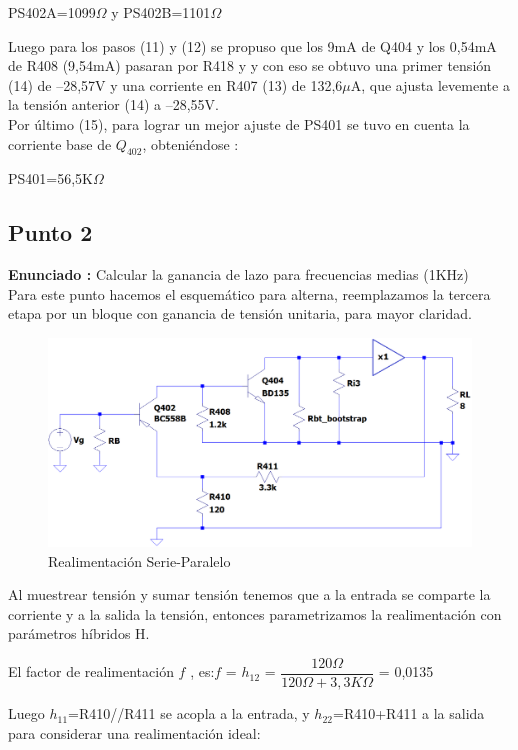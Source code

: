 \documentclass[12pt]{book}
\begin{document}
\begin{center}
PS402A=1099$\Omega$  y  PS402B=1101$\Omega$
\end{center}
Luego para los pasos (11) y (12) se propuso que los 9mA de Q404 y los 0,54mA de R408 (9,54mA) pasaran por R418 y y con eso se obtuvo una primer tensión (14) de –28,57V y una corriente en R407 (13) de 132,6$\mu$A, que ajusta levemente a la tensión anterior (14) a –28,55V.\\
Por último (15), para lograr un mejor ajuste de PS401 se tuvo en cuenta la corriente base de $Q_{402}$, obteniéndose :
\begin{center}
PS401=56,5K$\Omega$
\end{center}

\subsection{Punto 2}
\textbf{Enunciado : } Calcular la ganancia de lazo para frecuencias medias (1KHz)\\[1cm]
Para este punto hacemos el esquemático para alterna, reemplazamos la tercera etapa por un bloque con ganancia de tensión unitaria, para mayor claridad.\\
\begin{figure}[H]
\centering
\includegraphics[scale=0.4]{figuras/2-lazoCerrado.png}
\caption{Realimentación Serie-Paralelo}
\label{figura2-1}
\end{figure}
Al muestrear tensión y sumar tensión tenemos que a la entrada se comparte la corriente y a la salida la tensión, entonces parametrizamos la realimentación con parámetros híbridos H.
\begin{center}
El factor de realimentación $f$ , es:\qquad $f$ = $h_{12}$ = $\dfrac{120\Omega}{120\Omega+3,3K\Omega}$ = 0,0135
\end{center}
Luego $h_{11}$=R410//R411 se acopla a la entrada, y $h_{22}$=R410+R411 a la salida para considerar una realimentación ideal:
\end{document}
